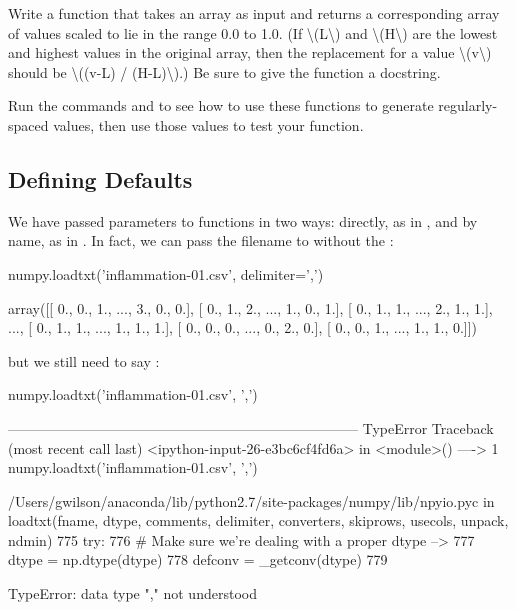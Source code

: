 \begin{challenge}
  Write a function  that takes an array as input and
  returns a corresponding array of values scaled to lie in the range 0.0
  to 1.0. (If \textbackslash{}(L\textbackslash{}) and
  \textbackslash{}(H\textbackslash{}) are the lowest and highest values
  in the original array, then the replacement for a value
  \textbackslash{}(v\textbackslash{}) should be \textbackslash{}((v-L) /
  (H-L)\textbackslash{}).) Be sure to give the function a docstring.
\end{challenge}

\begin{challenge}
  Run the commands  and
   to see how to use these functions to
  generate regularly-spaced values, then use those values to test your
   function.
\end{challenge}

\subsection{Defining Defaults}

We have passed parameters to functions in two ways: directly, as in
, and by name, as in
. In fact,
we can pass the filename to  without the
:

\begin{VerbIn}
numpy.loadtxt('inflammation-01.csv', delimiter=',')
\end{VerbIn}

\begin{VerbOut}
array([[ 0.,  0.,  1., ...,  3.,  0.,  0.],
       [ 0.,  1.,  2., ...,  1.,  0.,  1.],
       [ 0.,  1.,  1., ...,  2.,  1.,  1.],
       ...,
       [ 0.,  1.,  1., ...,  1.,  1.,  1.],
       [ 0.,  0.,  0., ...,  0.,  2.,  0.],
       [ 0.,  0.,  1., ...,  1.,  1.,  0.]])
\end{VerbOut}

but we still need to say :

\begin{VerbIn}
numpy.loadtxt('inflammation-01.csv', ',')
\end{VerbIn}

\begin{VerbErr}
---------------------------------------------------------------------------
TypeError                                 Traceback (most recent call last)
<ipython-input-26-e3bc6cf4fd6a> in <module>()
----> 1 numpy.loadtxt('inflammation-01.csv', ',')

/Users/gwilson/anaconda/lib/python2.7/site-packages/numpy/lib/npyio.pyc in loadtxt(fname, dtype, comments, delimiter, converters, skiprows, usecols, unpack, ndmin)
    775     try:
    776         # Make sure we're dealing with a proper dtype
--> 777         dtype = np.dtype(dtype)
    778         defconv = _getconv(dtype)
    779

TypeError: data type "," not understood
\end{VerbErr}


